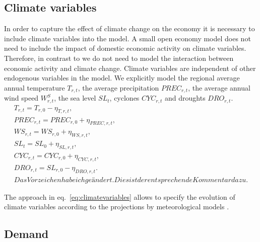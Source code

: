 \documentclass[10pt,a4paper]{article}
\begin{document}
\subsection{Climate variables}
In order to capture the effect of climate change on the economy it is necessary to include climate variables into the model. A small open economy model does not need to include the impact of domestic economic activity on climate variables. Therefore, in contrast to \cite{nordhaus1993optimal} we do not need to model the interaction between economic activity and climate change. Climate variables are independent of other endogenous variables in the model. We explicitly model the regional average annual temperature $T_{r,t}$, the average precipitation $PREC_{r,t}$, the average annual wind speed $W^S_{r,t}$, the sea level $SL_{t}$, cyclones $CYC_{r,t}$ and droughts $DRO_{r,t}$. 
\begin{align}\label{eq:climatevariables}
T_{r,t} = T_{r,0} - \eta_{T,r,t}, \nonumber \\
PREC_{r,t} = PREC_{r,0} + \eta_{PREC,r,t}, \nonumber \\
WS_{r,t} = WS_{r,0} + \eta_{WS,r,t}, \nonumber \\
SL_{t} = SL_{0} + \eta_{SL,r,t}, \nonumber \\
CYC_{r,t} = CYC_{r,0} + \eta_{CYC,r,t}, \nonumber \\
DRO_{r,t} = SL_{r,0} - \eta_{DRO,r,t}. \nonumber \\
Das Vorzeichen habe ich geändert. Dies ist der entsprechende Kommentar dazu.
\end{align}

The approach in eq.~\ref{eq:climatevariables} allows to specify the evolution of climate variables according to the projections by meteorological models \citep[e.g.][]{stocker2013climate}.

\subsection{Demand}
\end{document}

